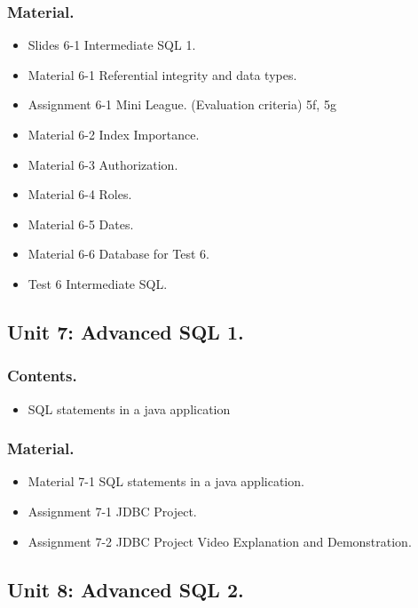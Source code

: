 \documentclass[catalan, a4paper, 12pt, titlepage]{article}
\begin{document}
  \subsubsection{Material.}
  \begin{itemize}
	  \item Slides 6-1 Intermediate SQL 1.
	  \item Material 6-1 Referential integrity and data types.
	  \item Assignment 6-1 Mini League. (\faGraduationCap Evaluation criteria) 5f, 5g
	  \item Material 6-2 Index Importance.
	  \item Material 6-3 Authorization.
	  \item Material 6-4 Roles.
	  \item Material 6-5 Dates.
	  \item Material 6-6 Database for Test 6.
	  \item Test 6 Intermediate SQL.

  \end{itemize}
  

  \subsection{Unit 7: Advanced SQL 1.}
  
  \subsubsection{Contents.}
  \begin{itemize}
	  \item SQL statements in a java application
  \end{itemize}

  \subsubsection{Material.}
  \begin{itemize}
	  \item Material 7-1 SQL statements in a java application.
	  \item Assignment 7-1 JDBC Project.
	  \item Assignment 7-2 JDBC Project Video Explanation and Demonstration.
  \end{itemize}

  \subsection{Unit 8: Advanced SQL 2.}
\end{document}
